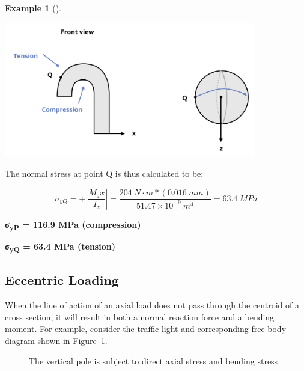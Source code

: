 \documentclass[
  letterpaper,
  DIV=11,
  numbers=noendperiod]{scrreprt}
\theoremstyle{definition}
\newtheorem{example}{Example}[chapter]
\theoremstyle{remark}
\begin{document}
\begin{tcolorbox}
\begin{example}[]
\begin{tcolorbox}
\begin{center}
\includegraphics[width=4.33333in,height=\textheight]{images/CH14 PNGs/example 14.1 part 3.png}
\end{center}

The normal stress at point Q is thus calculated to be:

\[
\sigma_{y Q}=+\left|\frac{M_z x}{I_z}\right|=\frac{204{~N}\cdot{m}*(0.016{~mm})}{51.47 \times 10^{-9}{~m}^4}=63.4{~MPa}
\]

\textbf{σ\textsubscript{yP} = 116.9 MPa (compression)}

\textbf{σ\textsubscript{yQ} = 63.4 MPa (tension)}

\end{tcolorbox}

\end{example}

\end{tcolorbox}

\subsection{Eccentric Loading}\label{sec-14.1.2}

When the line of action of an axial load does not pass through the
centroid of a cross section, it will result in both a normal reaction
force and a bending moment. For example, consider the traffic light and
corresponding free body diagram shown in Figure~\ref{fig-14.6}.

\begin{figure}


\caption{\label{fig-14.6}The vertical pole is subject to direct axial
stress and bending stress}

\end{figure}%
\end{document}
